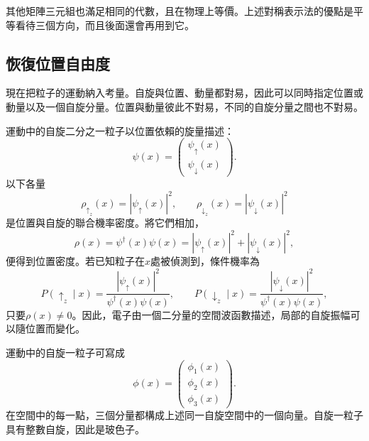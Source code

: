 其他矩陣三元組也滿足相同的代數，且在物理上等價。上述對稱表示法的優點是平等看待三個方向，而且後面還會再用到它。

\subsection{恢復位置自由度}

現在把粒子的運動納入考量。自旋與位置、動量都對易，因此可以同時指定位置或動量以及一個自旋分量。位置與動量彼此不對易，不同的自旋分量之間也不對易。

運動中的自旋二分之一粒子以位置依賴的旋量描述：
\begin{equation}
\psi(x)=
\begin{pmatrix}
\psi_\uparrow(x)\\
\psi_\downarrow(x)
\end{pmatrix}.
\end{equation}
以下各量
\begin{equation}
\rho_{\uparrow_z}(x)=|\psi_\uparrow(x)|^2,
\qquad
\rho_{\downarrow_z}(x)=|\psi_\downarrow(x)|^2
\end{equation}
是位置與自旋的聯合機率密度。將它們相加，
\begin{equation}
\rho(x)=\psi^\dagger(x)\psi(x)
=|\psi_\uparrow(x)|^2+|\psi_\downarrow(x)|^2,
\end{equation}
便得到位置密度。若已知粒子在\(x\)處被偵測到，條件機率為
\begin{equation}
P(\uparrow_z\mid x)
=
\frac{|\psi_\uparrow(x)|^2}{\psi^\dagger(x)\psi(x)},
\qquad
P(\downarrow_z\mid x)
=
\frac{|\psi_\downarrow(x)|^2}{\psi^\dagger(x)\psi(x)},
\end{equation}
只要\(\rho(x)\neq0\)。因此，電子由一個二分量的空間波函數描述，局部的自旋振幅可以隨位置而變化。

運動中的自旋一粒子可寫成
\begin{equation}
\phi(x)=
\begin{pmatrix}
\phi_1(x)\\
\phi_2(x)\\
\phi_3(x)
\end{pmatrix}.
\end{equation}
在空間中的每一點，三個分量都構成上述同一自旋空間中的一個向量。自旋一粒子具有整數自旋，因此是玻色子。

\begin{classroomqa}
\end{classroomqa}

